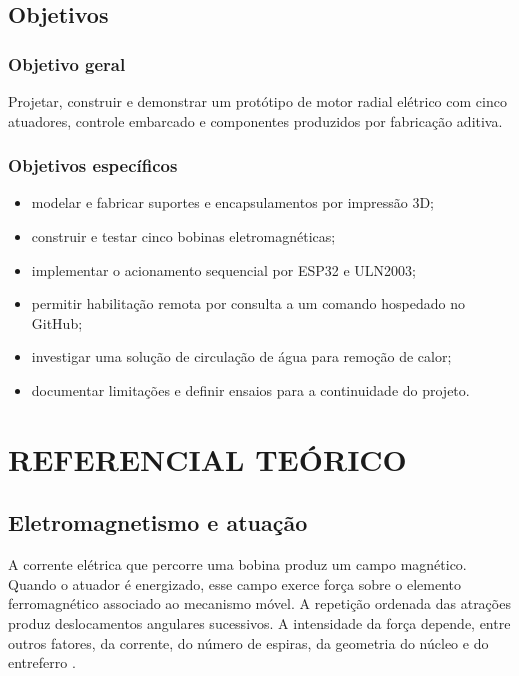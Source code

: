 \documentclass[12pt,a4paper,oneside]{article}
\begin{document}
\subsection{Objetivos}

\subsubsection{Objetivo geral}

Projetar, construir e demonstrar um protótipo de motor radial elétrico com cinco atuadores, controle embarcado e componentes produzidos por fabricação aditiva.

\subsubsection{Objetivos específicos}

\begin{itemize}
  \item modelar e fabricar suportes e encapsulamentos por impressão 3D;
  \item construir e testar cinco bobinas eletromagnéticas;
  \item implementar o acionamento sequencial por ESP32 e ULN2003;
  \item permitir habilitação remota por consulta a um comando hospedado no GitHub;
  \item investigar uma solução de circulação de água para remoção de calor;
  \item documentar limitações e definir ensaios para a continuidade do projeto.
\end{itemize}

\section{REFERENCIAL TEÓRICO}

\subsection{Eletromagnetismo e atuação}

A corrente elétrica que percorre uma bobina produz um campo magnético. Quando o atuador é energizado, esse campo exerce força sobre o elemento ferromagnético associado ao mecanismo móvel. A repetição ordenada das atrações produz deslocamentos angulares sucessivos. A intensidade da força depende, entre outros fatores, da corrente, do número de espiras, da geometria do núcleo e do entreferro \cite{halliday,fitzgerald}.
\end{document}
